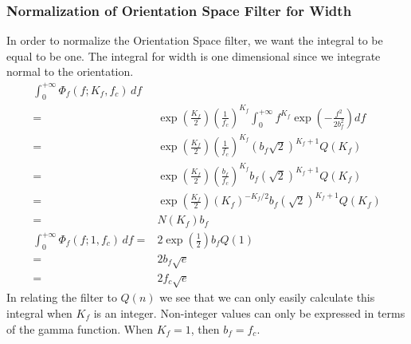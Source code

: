 \documentclass{article}
\begin{document}
\subsubsection{Normalization of Orientation Space Filter for Width}
In order to normalize the Orientation Space filter, we want the integral to be equal to be one. The integral for width is one dimensional since we integrate normal to the orientation.
\begin{eqnarray}
\int_0^{+\infty} \Phi_f(f; K_f, f_c) \, df 
       &  \\ 
      = & \exp \left(\frac{K_f}{2} \right)
            \left( \frac{1}{f_c} \right)^{K_f}
            \int_0^{+\infty} f^{K_f} \exp\left(-\frac{f^2}{2b_f^2}\right) df \\
      = &  \exp \left(\frac{K_f}{2} \right)
            \left( \frac{1}{f_c} \right)^{K_f}
            \left( b_f \sqrt{2} \right)^{K_f+1}
            Q(K_f) \\
      = & \exp \left(\frac{K_f}{2} \right)
            \left( \frac{b_f}{f_c} \right)^{K_f}
            b_f \left( \sqrt{2} \right)^{K_f+1}
            Q(K_f) \\
      = & \exp \left(\frac{K_f}{2} \right)
            \left( K_f \right)^{-K_f/2}
            b_f \left( \sqrt{2} \right)^{K_f+1}
            Q(K_f) \\
      = & N(K_f) b_f \\
\int_0^{+\infty} \Phi_f(f; 1, f_c) \, df 
       = & 2 \exp \left(\frac{1}{2} \right)
            b_f 
            Q(1) \\ 
       = & 2 b_f \sqrt{e} \\
       = & 2 f_c \sqrt{e}
\end{eqnarray}
In relating the filter to $ Q(n) $ we see that we can only easily calculate this integral when $ K_f $ is an integer. Non-integer values can only be expressed in terms of the gamma function. When $ K_f  = 1 $, then $ b_f = f_c $.
\end{document}

